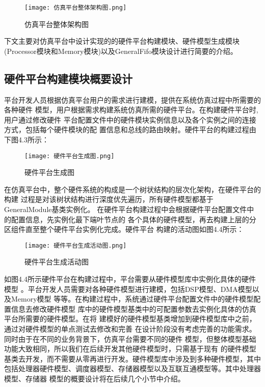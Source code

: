 \begin{figure}[h]
    \centering
    \texttt{[image: 仿真平台整体架构图.png]}
    \caption{仿真平台整体架构图}
    \label{fig:badge}
\end{figure}

下文主要对仿真平台中设计实现的的硬件平台构建模块、硬件模型生成模块
(Processor模块和Memory模块)以及GeneralFifo模块设计进行简要的介绍。

\subsection{硬件平台构建模块概要设计}
平台开发人员根据仿真平台用户的需求进行建模，提供在系统仿真过程中所需要的各种硬件
模型，用户根据需求构建系统仿真所需的硬件平台。在构建硬件平台时,用户通过修改硬件
平台配置文件中的硬件模块实例信息以及各个实例之间的连接方式，包括每个硬件模块的配
置信息和总线的路由映射。硬件平台的构建过程由下图4.3所示：

\begin{figure}[h]
    \centering
    \texttt{[image: 硬件平台生成图.png]}
    \caption{硬件平台生成图}
    \label{fig:badge}
\end{figure}

在仿真平台中，整个硬件系统的构成是一个树状结构的层次化架构，在硬件平台的构建
过程是对该树状结构进行深度优先遍历，所有硬件模型都基于GeneralModule基类实例化。
在硬件平台构建过程中会根据硬件平台配置文件中的配置信息，先实例化最下端叶节点的
各个具体的硬件模型，再去构建上层的分区组件直至整个硬件平台实例化完成。硬件平台
构建的活动图如图4.4所示：

\begin{figure}[h]
    \centering
    \texttt{[image: 硬件平台生成活动图.png]}
    \caption{硬件平台生成活动图}
    \label{fig:badge}
\end{figure}

如图4.4所示硬件平台在构建过程中，平台需要从硬件模型库中实例化具体的硬件模型
。平台开发人员需要对各种硬件模型进行建模，包括DSP模型、DMA模型以及Memory模型
等等。在构建过程中，系统通过硬件平台配置文件中的硬件模型配置信息去修改硬件模型
库中的硬件模型基类中的可配置参数去实例化具体的仿真平台所需要的硬件模型。在将
建模好的硬件模型基类增加到硬件模型库中之前，通过对硬件模型的单点测试去修改和完善
在设计阶段没有考虑完善的功能需求。同时由于在不同的业务背景下，仿真平台需要不同的硬件
模型，但整体模型基础功能大致相同，所以我们在后续开发其他硬件模型时，只需基于现有
的硬件模型基类去开发，而不需要从零再进行开发。硬件模型库中涉及到多种硬件模型，其中
包括处理器硬件模型、调度器模型、存储器模型以及互联互通模型等。其中处理器模型、存储器
模型的概要设计将在后续几个小节中介绍。

